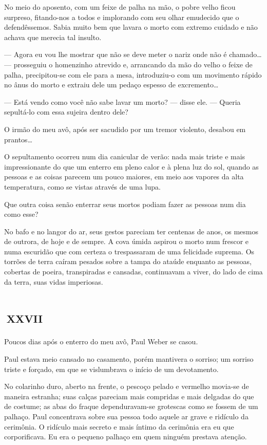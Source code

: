 No meio do aposento, com um feixe de palha na mão, o pobre velho ficou surpreso, fitando-nos a todos e implorando com seu olhar emudecido que o defendêssemos. Sabia muito bem que lavara o morto com extremo cuidado e não achava que merecia tal insulto.

--- Agora eu vou lhe mostrar que não se deve meter o nariz onde não é chamado\ldots{} --- prosseguiu o homenzinho atrevido e, arrancando da mão do velho o feixe de palha, precipitou-se com ele para a mesa, introduziu-o com um movimento rápido no ânus do morto e extraiu dele um pedaço espesso de excremento\ldots{}

--- Está vendo como você não sabe lavar um morto? --- disse ele. --- Queria sepultá-lo com essa sujeira dentro dele?

O irmão do meu avô, após ser sacudido por um tremor violento, desabou em prantos\ldots{}

O sepultamento ocorreu num dia canicular de verão: nada mais triste e mais impressionante do que um enterro em pleno calor e à plena luz do sol, quando as pessoas e as coisas parecem um pouco maiores, em meio aos vapores da alta temperatura, como se vistas através de uma lupa.

Que outra coisa senão enterrar seus mortos podiam fazer as pessoas num dia como esse?

No bafo e no langor do ar, seus gestos pareciam ter centenas de anos, os mesmos de outrora, de hoje e de sempre. A cova úmida aspirou o morto num frescor e numa escuridão que com certeza o trespassaram de uma felicidade suprema. Os torrões de terra caíram pesados sobre a tampa do ataúde enquanto as pessoas, cobertas de poeira, transpiradas e cansadas, continuavam a viver, do lado de cima da terra, suas vidas imperiosas. 


\chapter*{\small{}\,\Large\centering\textsc{xxvii}\,\small{}}

Poucos dias após o enterro do meu avô, Paul Weber se casou.

Paul estava meio cansado no casamento, porém mantivera o sorriso; um sorriso triste e forçado, em que se vislumbrava o início de um devotamento.

No colarinho duro, aberto na frente, o pescoço pelado e vermelho movia-se de maneira estranha; suas calças pareciam mais compridas e mais delgadas do que de costume; as abas do fraque dependuravam-se grotescas como se fossem de um palhaço. Paul concentrava sobre sua pessoa todo aquele ar grave e ridículo da cerimônia. O ridículo mais secreto e mais íntimo da cerimônia era eu que corporificava. Eu era o pequeno palhaço em quem ninguém prestava atenção.

